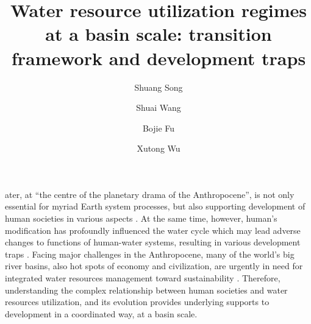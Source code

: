 \documentclass[9pt, twocolumn, twoside, lineno]{pnas-new}
\title{Water resource utilization regimes at a basin scale: transition framework and development traps}
\author[a, b]{Shuang Song}  %
\author[a, b, 1]{Shuai Wang}  %
\author[a, b]{Bojie Fu}  %
\author[c, d]{Xutong Wu}  %
\affil[a]{ %
	State Key Laboratory of Earth Surface Processes and Resource Ecology, 
	Faculty of Geographical Science, 
	Beijing Normal University, 
	Beijing 100875, 
	P.R. China
}
\affil[b]{ %
	Institute of Land Surface System and Sustainability, 
	Faculty of Geographical Science, 
	Beijing Normal University, 
	Beijing 100875, 
	P.R. China
}
\affil[c]{ %
	College of Urban and Environmental Sciences, 
	Peking University, 
	Beijing 100871, 
	P.R. China
}
\affil[d]{ %
	State Key Laboratory of Urban and Regional Ecology, 
	Research Center for Eco-Environmental Sciences, 
	Chinese Academy of Sciences, 
	Beijing 100085, 
	P.R. China 
}
\begin{document}
\maketitle
\thispagestyle{firststyle}

ater, at “the centre of the planetary drama of the Anthropocene”, is not only essential for myriad Earth system processes, but also supporting development of human societies in various aspects \cite{gleesonIlluminatingWaterCycle2020}. 
At the same time, however, human's modification has profoundly influenced the water cycle which may lead adverse changes to functions of human-water systems, resulting in various development traps \cite{cummingLinkingEconomicGrowth2018}. 
Facing major challenges in the Anthropocene, many of the world's big river basins, also hot spots of economy and civilization, are urgently in need for integrated water resources management toward sustainability \cite{bestAnthropogenicStressesWorld2019}. 
Therefore, understanding the complex relationship between human societies and water resources utilization, and its evolution provides underlying supports to development in a coordinated way, at a basin scale.
\end{document}
